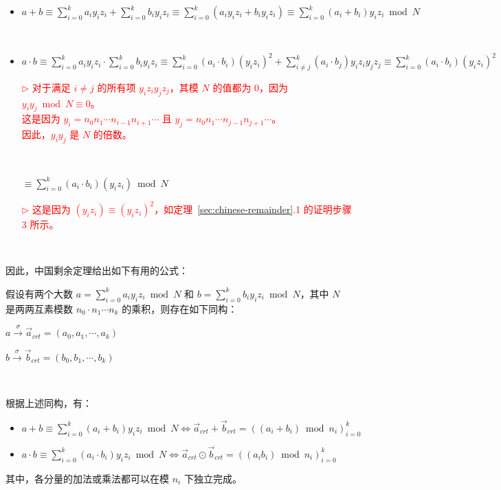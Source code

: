 \begin{itemize}
\item $a + b \equiv \sum\limits_{i=0}^k a_i y_i z_i + \sum\limits_{i=0}^k b_i y_i z_i \equiv \sum\limits_{i=0}^k (a_i y_i z_i + b_i y_i z_i) \equiv \sum\limits_{i=0}^k (a_i + b_i) y_i z_i \bmod N $

$ $

\item $a \cdot b \equiv \sum\limits_{i=0}^k a_i y_i z_i \cdot \sum\limits_{i=0}^k b_i y_i z_i \equiv \sum\limits_{i=0}^k (a_i \cdot b_i) (y_i z_i)^2  + \sum\limits_{i\neq j}^k (a_i \cdot b_j) y_i z_iy_j z_j \equiv \sum\limits_{i=0}^k (a_i \cdot b_i) (y_i z_i)^2$

\textcolor{red}{ $\rhd$ 对于满足 $i \neq j$ 的所有项 $y_iz_iy_jz_j$，其模 $N$ 的值都为 0，因为 $y_iy_j \bmod N \equiv 0$。\\
这是因为 $y_i = n_0n_1\cdots n_{i-1}n_{i+1}\cdots$ 且 $y_j = n_0n_1\cdots n_{j-1}n_{j+1}\cdots$。\\
因此，$y_iy_j$ 是 $N$ 的倍数。}

$ $

$\equiv \sum\limits_{i=0}^k (a_i \cdot b_i) (y_i z_i) \bmod N$

\textcolor{red}{ $\rhd$ 这是因为 $(y_i z_i) \equiv (y_i z_i)^2$，如定理~\ref*{sec:chinese-remainder}.1 的证明步骤 3 所示。}


\end{itemize}

$ $

因此，中国剩余定理给出如下有用的公式：

\begin{tcolorbox}[title={\textbf{\tboxtheorem{\ref*{sec:chinese-remainder}.2} 中国剩余定理的应用}}]

假设有两个大数 $a = \sum\limits_{i=0}^k a_i y_i z_i \bmod N$ 和 $b = \sum\limits_{i=0}^k b_i y_i z_i \bmod N$，其中 $N$ 是两两互素模数 $n_0 \cdot n_1 \cdots n_k$ 的乘积，则存在如下同构：

$a \xrightarrow{\sigma} \vec{a}_{\mathit{crt}} = (a_0, a_1, \cdots, a_k)$

$b \xrightarrow{\sigma} \vec{b}_{\mathit{crt}} = (b_0, b_1, \cdots, b_k)$

$ $

根据上述同构，有：

\begin{itemize}

\item $a + b \equiv \sum\limits_{i=0}^k (a_i + b_i) y_i z_i \bmod N \Longleftrightarrow \vec{a}_{\mathit{crt}} + \vec{b}_{\mathit{crt}} = ((a_i+b_i)\bmod n_i)_{i=0}^{k}$

\item $a \cdot b \equiv \sum\limits_{i=0}^k (a_i \cdot b_i) y_i z_i \bmod N \Longleftrightarrow \vec{a}_{\mathit{crt}} \odot \vec{b}_{\mathit{crt}} = ((a_i b_i)\bmod n_i)_{i=0}^{k}$


\end{itemize}



其中，各分量的加法或乘法都可以在模 $n_i$ 下独立完成。

\end{tcolorbox}
